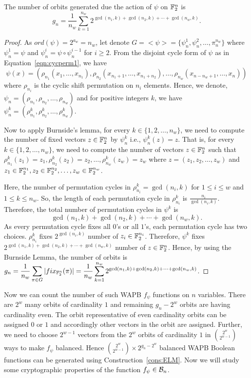 \documentclass{llncs}
\begin{document}
\begin{theorem}
The number of orbits generated due the action of $\psi$ on $\mathbb{F}_2^n$ is
$$g_n= \frac{1}{n_w} \sum_{k=1}^{n_w}  2^{\gcd(n_1,k)+ \gcd(n_2,k) + \cdots + \gcd(n_w,k)}.$$
\end{theorem}
\begin{proof}
As $ord(\psi) = 2^{a_w} = n_w$, let denote $G = <\psi> = \{\psi_n^1,\psi_n^2, \ldots, \pi_n^{n_w}\}$ where $\psi_n^1 = \psi$ and $\psi_n^i = \psi \circ \psi_n^{i-1}$ for $i \geq 2$. From the disjoint cycle form of $\psi$ as in Equation~\ref{eqn:cycperm1}, we have 
$$\psi(x) = (\rho_{n_1}(x_1,\ldots,x_{n_1}), \rho_{n_2}(x_{n_1+1},\ldots,x_{n_1+n_2}), \ldots, \rho_{n_w}(x_{n-n_w+1},\ldots,x_n))$$
where $\rho_{n_i}$ is the cyclic shift permutation on $n_i$ elements.
Hence, we denote, $\psi_n = (\rho_{n_1},\rho_{n_2},\ldots,\rho_{n_w})$ and for positive integers $k$, we have $\psi_n^k = (\rho_{n_1}^k,\rho_{n_2}^k,\ldots,\rho_{n_w}^k)$.

Now to apply Burnside's lemma, for every $k \in \{1, 2, \ldots, n_w\}$, we need to compute the number of fixed vectors $z \in \mathbb{F}_2^n$ by $\psi_n^k$ i.e., $\psi_n^k(z) = z$. That is, for every $k \in \{1, 2, \ldots, n_w\}$, we need to compute the number of vectors $z \in \mathbb{F}_2^n$ such that $\rho_{n_1}^k(z_1) = z_1, \rho_{n_2}^k(z_2) = z_2, \ldots, \rho_{n_w}^k(z_w) = z_w$ where $z = (z_1,z_2, \ldots, z_w)$ and $z_1 \in \mathbb{F}_2^{n_1}, z_2 \in \mathbb{F}_2^{n_2}, \ldots, z_w \in \mathbb{F}_2^{n_w}$.

Here, the number of permutation cycles in $\rho_{n_i}^k= \gcd(n_i,k)$ for $1 \leq i \leq w$ and $1 \leq k \leq n_w$. So, the length of each permutation cycle in $\rho_{n_i}^k$ is $\frac{n_i}{\gcd(n_i,k)}$. 
Therefore, the total number of permutation cycles in $\psi^k$ is $$\gcd(n_1,k)+ \gcd(n_2,k) + \cdots + \gcd(n_w,k).$$
As every permutation cycle fixes all $0$'s or all $1$'s, each permutation cycle has two choices.
$\rho_{n_i}^k$ fixes $2^{\gcd(n_i,k)}$ number of $z_i \in \mathbb{F}_2^{n_i}$. Therefore, $\psi^k$ fixes $2^{\gcd(n_1,k)+ \gcd(n_2,k) + \cdots + \gcd(n_w,k)}$ number of $z \in \mathbb{F}_2^n$. Hence, by using the Burnside Lemma, the number of orbits is\\
$\displaystyle{g_n = \frac{1}{n_w} \sum_{\pi \in G} |fix_{\mathbb{F}_2^n}(\pi)| 
    = \frac{1}{n_w} \sum_{k=1}^{n_w}  2^{\gcd(n_1,k)+ \gcd(n_2,k) + \cdots + \gcd(n_w,k)}}$.
\end{proof}
Now we can count the number of such WAPB $f_\psi$ functions on $n$ variables. There are $2^w$ many orbits of cardinality $1$ and remaining $g_n - 2^w$ orbits are having cardinality even. The orbit representative of even cardinality orbits can be assigned $0$ or $1$ and accordingly other vectors in the orbit are assigned. Further, we need to choose $2^{w-1}$ vectors from the $2^w$ orbits of cardinality $1$ in $\binom{2^w}{2^{w-1}}$ ways to make $f_\psi$ balanced. Hence $\binom{2^w}{2^{w-1}}\times 2^{g_n - 2^w}$ balanced WAPB Boolean functions can be generated using Construction~\ref{cons:ELM}.
Now we will study some cryptographic properties of the function $f_\psi \in \mathcal{B}_n$. 
\end{document}
